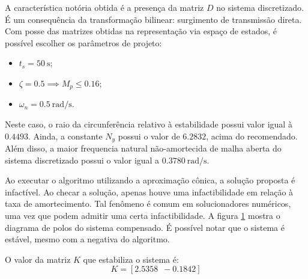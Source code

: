 A característica notória obtida é a presença da matriz $D$ no sistema discretizado. É um consequência da transformação bilinear: surgimento de transmissão direta. Com posse das matrizes obtidas na representação via espaço de estados, é possível escolher os parâmetros de projeto:
\begin{itemize}
  \item $t_s = \SI{50}{\second}$;
  \item $\zeta = 0.5 \implies M_p \leq 0.16$;
  \item $\omega_n = \SI{0.5}{\radian/\second}$.
\end{itemize}

Neste caso, o raio da circunferência relativo à estabilidade possui valor igual à $0.4493$. Ainda, a constante $N_y$ possui o valor de $6.2832$, acima do recomendado. Além disso, a maior frequencia natural não-amortecida de malha aberta do sistema discretizado possui o valor igual a $\SI{0.3780}{\radian/\second}$.

Ao executar o algoritmo utilizando a aproximação cônica, a solução proposta é infactível. Ao checar a solução, apenas houve uma infactibilidade em relação à taxa de amortecimento. Tal fenômeno é comum em solucionadores numéricos, uma vez que podem admitir uma certa infactibilidade. A figura \ref{subfig:TesteC} mostra o diagrama de polos do sistema compensado. É possível notar que o sistema é estável, mesmo com a negativa do algoritmo.

\begin{figure}[!ht]
  \centering
  \begin{subfigure}[t]{0.3\columnwidth}
    
      \caption{}
      \label{subfig:TesteC}
  \end{subfigure}
  \begin{subfigure}[t]{0.3\columnwidth}
    
      \caption{}
      \label{subfig:TesteE}
  \end{subfigure}
  \begin{subfigure}[t]{0.3\columnwidth}
    
    \caption{}
    \label{subfig:TesteP}
  \end{subfigure}
  \caption{}
  \label{fig:PrimeiroTeste}
\end{figure}

O valor da matriz $K$ que estabiliza o sistema é:
\begin{equation}
  K = \left[2.5358 \enspace -0.1842\right]\label{res:GanhoC}
\end{equation}

